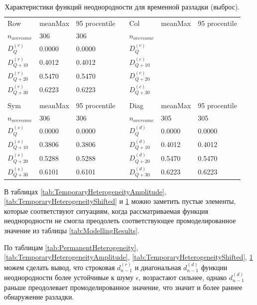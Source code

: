 \documentclass[specialist, substylefile = spbu.rtx,
			   subf, href, 12pt]{disser}
\begin{document}
\begin{table}[!hhh]
	\caption{Характеристики функций неоднородности для временной разладки (выброс).}
	\begin{tabular}{lllllll}
		Row & meanMax & 95 procentile &  & Col & meanMax & 95 procentile \\
		$n_{overcome}$ & 306 & 306 &  & $n_{overcome}$ &  &  \\
		$D_Q^{(r)}$ & 0.0000 & 0.0000 &  & $D_Q^{(c)}$ &  &  \\
		$D_{Q+10}^{(r)}$ & 0.4012 & 0.4012 &  & $D_{Q+10}^{(c)}$ &  &  \\
		$D_{Q+20}^{(r)}$ & 0.5470 & 0.5470 &  & $D_{Q+20}^{(c)}$ &  &  \\
		$D_{Q+30}^{(r)}$ & 0.6223 & 0.6223 &  & $D_{Q+30}^{(c)}$ &  &  \\
		&  &  &  &  &  &  \\
		Sym & meanMax & 95 procentile &  & Diag & meanMax & 95 procentile \\
		$n_{overcome}$ & 306 & 306 &  & $n_{overcome}$ & 305 & 305 \\
		$D_Q^{(s)}$ & 0.0000 & 0.0000 &  & $D_Q^{(d)}$ & 0.0000 & 0.0000 \\
		$D_{Q+10}^{(s)}$ & 0.3806 & 0.3806 &  & $D_{Q+10}^{(d)}$ & 0.4012 & 0.4012 \\
		$D_{Q+20}^{(s)}$ & 0.5288 & 0.5288 &  & $D_{Q+20}^{(d)}$ & 0.5470 & 0.5470 \\
		$D_{Q+30}^{(s)}$ & 0.6101 & 0.6101 &  & $D_{Q+30}^{(d)}$ & 0.6223 & 0.6223
	\end{tabular}
	\label{tab:TemporaryHeterogeneityOutlier}
\end{table}

В таблицах \ref{tab:TemporaryHeterogeneityAmplitude}, \ref{tab:TemporaryHeterogeneityShifted} и \ref{tab:TemporaryHeterogeneityOutlier} можно заметить пустые элементы, которые соответствуют ситуациям, когда рассматриваемая функция неоднородности не смогла преодолеть соответствующее промоделированное значение из таблицы \ref{tab:ModellingResults}.

По таблицам \ref{tab:PermanentHeterogeneity}, \ref{tab:TemporaryHeterogeneityAmplitude}, \ref{tab:TemporaryHeterogeneityShifted}, \ref{tab:TemporaryHeterogeneityOutlier} можем сделать вывод, что строковая $d_{n-1}^{(r)}$ и диагональная $d_{n-1}^{(d)}$ функции неоднородности более устойчивые к шуму $\epsilon$, возрастают сильнее, однако $d_{n-1}^{(d)}$ раньше преодолевает промоделированное значение, что значит и более раннее обнаружение разладки.
\end{document}
